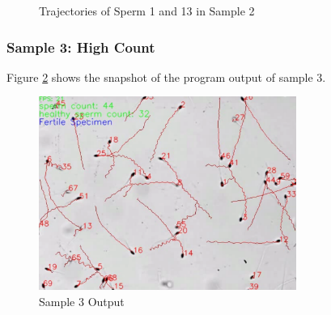 \begin{figure}[h]
\begin{subfigure}[b]{0.35\textwidth}
     \end{subfigure}
        \caption{Trajectories of Sperm 1 and 13 in Sample 2}
        \label{sam22}
\end{figure}
\newpage
\subsubsection{Sample 3: High Count}
Figure \ref{sam3res} shows the snapshot of the program output of sample 3.
\begin{figure}[h]
    \centering
    \includegraphics[width=0.75\textwidth]{Images/sam3.png}
    \caption{Sample 3 Output}
    \label{sam3res}
\end{figure}

